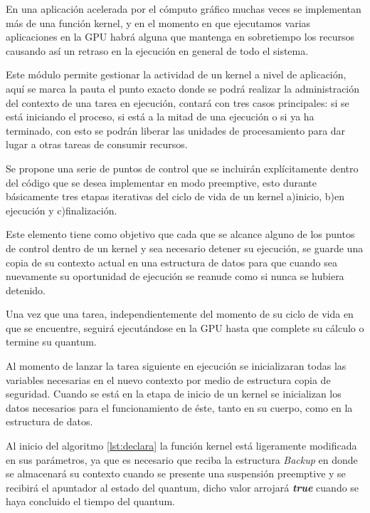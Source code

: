 
En una aplicación acelerada por el cómputo gráfico muchas veces se implementan más de una función kernel, y en el momento en que ejecutamos varias aplicaciones en la GPU habrá alguna que mantenga en sobretiempo los recursos causando así un retraso en la ejecución en general de todo el sistema.
\newline

Este módulo permite gestionar la actividad de un kernel a nivel de aplicación, aquí se marca la pauta el punto exacto donde se podrá realizar la administración del contexto de una tarea en ejecución, contará con tres casos principales: si se está iniciando el proceso, si está a la mitad de una ejecución o si ya ha terminado, con esto se podrán liberar las unidades de procesamiento para dar lugar a otras tareas de consumir recursos.
\newline

Se propone una serie de puntos de control que se incluirán explícitamente dentro del código que se desea implementar en modo preemptive, esto durante básicamente tres etapas iterativas del ciclo de vida de un kernel a)inicio, b)en ejecución y c)finalización. 
\newline

Este elemento tiene como objetivo que cada que se alcance alguno de los puntos de control dentro de un kernel y sea necesario detener su ejecución, se guarde una copia de su contexto actual en una estructura de datos para que cuando sea nuevamente su oportunidad de ejecución se reanude como si nunca se hubiera detenido. 
\newline

Una vez que una tarea, independientemente del momento de su ciclo de vida en que se encuentre, seguirá ejecutándose en la GPU hasta que complete su cálculo o termine su quantum.
\newline

Al momento de lanzar la tarea siguiente en ejecución se inicializaran todas las variables necesarias en el nuevo contexto por medio de estructura copia de seguridad. Cuando se está en la etapa de inicio de un kernel se inicializan los datos necesarios para el funcionamiento de éste, tanto en su cuerpo, como  en la estructura de datos.
\newline

Al inicio del algoritmo \ref{lst:declara} la función kernel está ligeramente modificada en sus parámetros, ya que es necesario que reciba la estructura \textit{Backup} en donde se almacenará su contexto cuando se presente una suspensión preemptive y se recibirá el apuntador al estado del quantum, dicho valor arrojará \textbf{\textit{true}} cuando se haya concluido el tiempo del quantum.
\newline

